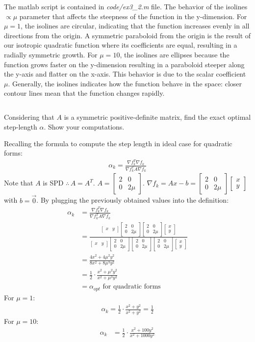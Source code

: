 \documentclass[unicode,11pt,a4paper,oneside,numbers=endperiod,openany]{scrartcl}
\newcommand{\myvec}[1]{\begin{bmatrix} #1 \end{bmatrix}}
\newcommand{\myex}[1]{\begin{equation*}\begin{aligned} #1 \end{aligned}\end{equation*}}
\newcommand{\myexthreeA}{\myvec{2 & 0 \\ 0 & 2\mu}}
\begin{document}
The matlab script is contained in \textit{code/ex3\_2.m} file. \newline
The behavior of the isolines $\propto \mu$ parameter that affects the steepness of the function in the y-dimension.
For $\mu = 1$, the isolines are circular, indicating that the function increases evenly in all directions from the origin.
A symmetric paraboloid from the origin is the result of our isotropic quadratic function where its coefficients
are equal, resulting in a radially symmetric growth.
For $\mu = 10$, the isolines are ellipses because the function grows faster on the y-dimension resulting in a paraboloid
steeper along the y-axis and flatter on the x-axis. 
This behavior is due to the scalar coefficient $\mu$.
Generally, the isolines indicates how the function behave in the space: 
closer contour lines mean that the function changes rapidly. 

\subsection{}
Considering that $A$ is a symmetric positive-definite matrix, find the exact optimal step-length $\alpha$.
Show your computations.\newline

Recalling the formula to compute the step length in ideal case for quadratic forms:
\myex{
    \alpha_k = \frac{\nabla f_k^T \nabla f_k}{\nabla f_k^T A \nabla f_k}
}
Note that $A$ is SPD $\therefore \, A = A^T$. 
$A = \myexthreeA$. $\nabla f_k = Ax - b = \myexthreeA \myvec{x \\ y}$ with $b = \vec{0}$. \newline
By plugging the previously obtained values into the definition:
\myex{
    \alpha_k 
    & = \frac{\nabla f_k^T \nabla f_k}{\nabla f_k^T A \nabla f_k} \\
    & = \frac{\myvec{x & y} \myexthreeA \myexthreeA \myvec{x \\ y}} 
            {\myvec{x & y} \myexthreeA \myexthreeA \myexthreeA \myvec{x \\ y}} \\
    & = \frac{4x^2 + 4 \mu^2 y^2}{8x^2 + 8 \mu^3 y^2} \\
    & = \frac{1}{2} \cdot \frac{x^2 + \mu^2 y^2}{x^2 + \mu^3 y^2} \\
    & = \alpha_{opt} \text{ for quadratic forms}
}
For $\mu = 1$:
\myex{
    \alpha_k 
    = \frac{1}{2} \cdot \frac{x^2 + y^2}{x^2 + y^2}
    = \frac{1}{2}
}
For $\mu = 10$:
\myex{
    \alpha_k 
    & = \frac{1}{2} \cdot \frac{x^2 + 100 y^2}{x^2 + 1000 y^2} \\
}
\end{document}
